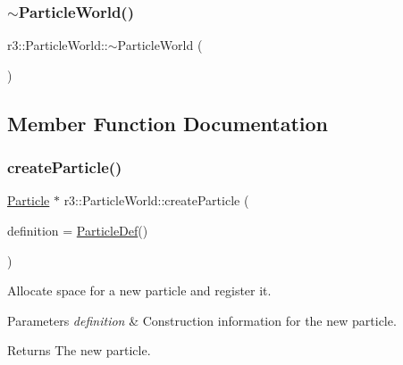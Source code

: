 \mbox{\label{classr3_1_1_particle_world_a3a6d6f87b726156c41d4282c6dbb1e48}} 
\subsubsection{\texorpdfstring{$\sim$\+Particle\+World()}{~ParticleWorld()}}
{\footnotesize\ttfamily r3\+::\+Particle\+World\+::$\sim$\+Particle\+World (\begin{DoxyParamCaption}{ }\end{DoxyParamCaption})\hspace{0.3cm}{\ttfamily [default]}}



\subsection{Member Function Documentation}
\mbox{\label{classr3_1_1_particle_world_a467a56ef835bbd7c3a23b722db81fa5e}} 
\subsubsection{\texorpdfstring{create\+Particle()}{createParticle()}}
{\footnotesize\ttfamily \mbox{\hyperlink{classr3_1_1_particle}{Particle}} $\ast$ r3\+::\+Particle\+World\+::create\+Particle (\begin{DoxyParamCaption}\item[{\mbox{\hyperlink{structr3_1_1_particle_def}{Particle\+Def}}}]{definition = {\ttfamily \mbox{\hyperlink{structr3_1_1_particle_def}{Particle\+Def}}()} }\end{DoxyParamCaption})}



Allocate space for a new particle and register it. 


\begin{DoxyParams}{Parameters}
{\em definition} & Construction information for the new particle. \\
\hline
\end{DoxyParams}
\begin{DoxyReturn}{Returns}
The new particle. 
\end{DoxyReturn}
\mbox{\label{classr3_1_1_particle_world_aa061b4eab09216fb7e3a8d08cbdb6dd2}} 
